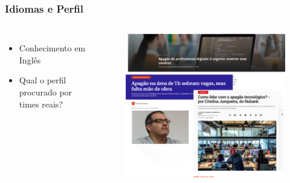 \documentclass[    
  12pt, 
  compress,
  aspectratio=169,
  blue
  ]{beamer}
\begin{document}
\begin{frame}
\frametitle{ Idiomas e Perfil}   
\begin{columns}[c]
\begin{itemize}
\item<1-> Conhecimento em Inglês 
\item<2-> Qual o perfil procurado por times reais?  
\end{itemize}
\centering
\begin{figure}
\includegraphics[scale=0.4]{apagao}
\end{figure}
\end{columns}
\end{frame}
\end{document}

